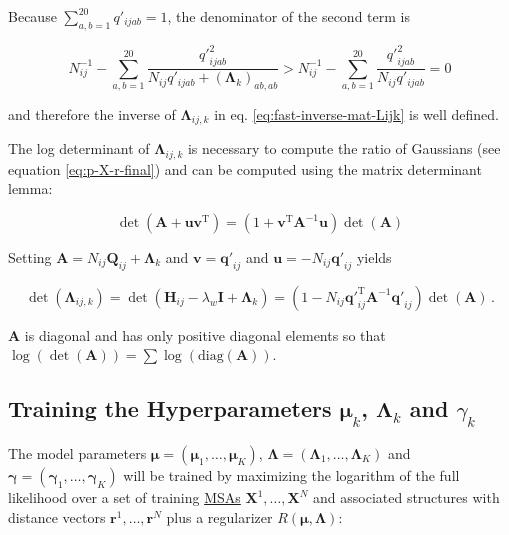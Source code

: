 \documentclass[12pt,a4paper,twoside]{book}
\renewcommand{\H}{\mathbf{H}}
\newcommand{\I}{\mathbf{I}}
\newcommand{\Lijk}{\mathbf{\Lambda}_{ij,k}}
\newcommand{\Lk}{\mathbf{\Lambda}_k}
\newcommand{\muk}{\mathbf{\mu}_k}
\renewcommand{\r}{\mathbf{r}}
\newcommand{\Qij}{\mathbf{Q}_{ij}}
\newcommand{\qij}{\mathbf{q\prime}_{ij}}
\renewcommand{\v}{\mathbf{v}}
\newcommand{\X}{\mathbf{X}}
\theoremstyle{definition}
\theoremstyle{definition}
\theoremstyle{remark}
\begin{document}
Because \(\sum_{a,b=1}^{20} q'_{ijab} = 1\), the denominator of the
second term is

\begin{equation}
    N_{ij}^{-1} - \sum_{a,b=1}^{20}  \frac{{q'}_{ijab}^2}{N_{ij} q'_{ijab} + {(\Lk)}_{ab,ab} } > N_{ij}^{-1} - \sum_{a,b=1}^{20} \frac{{q'}^2_{ijab}}{N_{ij} q'_{ijab}} = 0
\end{equation}

and therefore the inverse of \(\Lijk\) in eq.
\eqref{eq:fast-inverse-mat-Lijk} is well defined.

The log determinant of \(\Lijk\) is necessary to compute the ratio of
Gaussians (see equation \eqref{eq:p-X-r-final}) and can be computed using
the matrix determinant lemma:

\begin{equation}
  \det(\mathbf{A} + \mathbf{uv}^\mathrm{T}) = (1+\mathbf{v}^\mathrm{T} \mathbf{A}^{-1} \mathbf{u}) \det(\mathbf{A})
\end{equation}

Setting \(\mathbf{A} = N_{ij} \Qij + \Lk\) and \(\v = \qij\) and
\(\mathbf{u} = - N_{ij} \qij\) yields

\begin{equation}
  \det(\Lijk ) = \det(\H_{ij} - \lambda_w \I + \Lk) = (1 - N_{ij}\qij^\mathrm{T} \mathbf{A}^{-1}\qij) \det(\mathbf{A}) \,.
\end{equation}

\(\mathbf{A}\) is diagonal and has only positive diagonal elements so
that
\(\log(\det(\mathbf{A})) = \sum \log \left( \text{diag}(\mathbf{A}) \right)\).

\subsection{\texorpdfstring{Training the Hyperparameters \(\muk\),
\(\Lk\) and
\(\gamma_k\)}{Training the Hyperparameters \textbackslash{}muk, \textbackslash{}Lk and \textbackslash{}gamma\_k}}\label{training-hyperparameters}

The model parameters
\(\mathbf{\mu} = (\mathbf{\mu}_{1},\ldots,\mathbf{\mu}_K)\),
\(\mathbf{\Lambda} = (\mathbf{\Lambda}_1,\ldots,\mathbf{\Lambda}_K)\)
and \(\mathbf{\gamma} = (\mathbf{\gamma}_1,\ldots,\mathbf{\gamma}_K)\)
will be trained by maximizing the logarithm of the full likelihood over
a set of training \protect\hyperlink{abbrev}{MSAs} \(\X^1,\ldots,\X^N\)
and associated structures with distance vectors \(\r^1,\ldots,\r^N\)
plus a regularizer \(R(\mathbf{\mu}, \mathbf{\Lambda})\):
\end{document}

